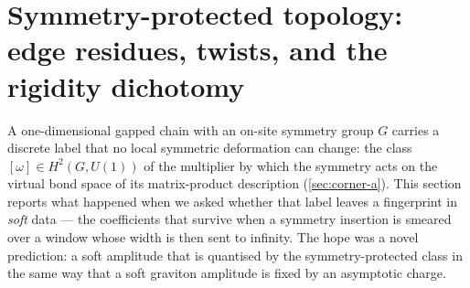 
\newcommand{\sptTransfer}{\mathbb{E}}        %
\newcommand{\sptComp}{\mathcal{C}}           %
\newcommand{\sptResid}{\mathfrak{R}}       %
\newcommand{\sptSend}{\mathbb{S}}            %
\newcommand{\sptPad}{\mathcal{M}}         %
\newcommand{\sptDeph}{\mathcal{D}}           %
\newcommand{\sptBulk}{\mathfrak{F}}       %



\section{Symmetry-protected topology: edge residues, twists, and the rigidity
dichotomy}\label{sec:spt}

A one-dimensional gapped chain with an on-site symmetry group $G$ carries a
discrete label that no local symmetric deformation can change: the class
$[\omega]\in H^{2}(G,U(1))$ of the multiplier by which the symmetry acts on
the virtual bond space of its matrix-product description
(\cref{sec:corner-a}). This section reports what happened when we asked
whether that label leaves a fingerprint in \emph{soft} data --- the
coefficients that survive when a symmetry insertion is smeared over a window
whose width is then sent to infinity. The hope was a novel prediction: a soft
amplitude that is quantised by the symmetry-protected class in the same way
that a soft graviton amplitude is fixed by an asymptotic charge.

